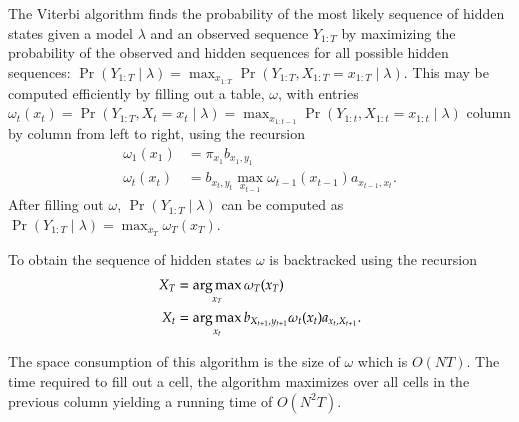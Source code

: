 The Viterbi algorithm finds the probability of the most likely sequence of
hidden states given a model $\lambda$ and an observed sequence $Y_{1:T}$ by
maximizing the probability of the observed and hidden sequences for all
possible hidden sequences: $\Pr(Y_{1:T} \mid \lambda) = \max_{x_{1:T}}
\Pr(Y_{1:T}, X_{1:T} = x_{1:T} \mid \lambda)$. This may be computed efficiently
by filling out a table, $\omega$, with entries $\omega_t(x_t) = \Pr(Y_{1:T},
X_t = x_t \mid \lambda) = \max_{x_{1:t-1}} \Pr(Y_{1:t}, X_{1:t} = x_{1:t} \mid
\lambda)$ column by column from left to right, using the recursion
\begin{align*}
  \omega_1(x_1) &= \pi_{x_1} b_{x_1, y_1} \\
  \omega_t(x_t) &= b_{x_t, y_t} \max_{x_{t - 1}} \omega_{t - 1}(x_{t - 1})
                  a_{x_{t - 1}, x_t}.
\end{align*}
After filling out $\omega$, $\Pr(Y_{1:T} \mid \lambda)$ can be computed as
$\Pr(Y_{1:T} \mid \lambda) = \max_{x_T} \omega_T(x_T)$.

To obtain the sequence of hidden states $\omega$ is backtracked using the
recursion
\begin{align*}
  X_T &= \operatorname*{arg\,max}_{x_T} \omega_T(x_T) \\
  X_{t} &= \operatorname*{arg\,max}_{x_{t}} b_{X_{t + 1}, y_{t + 1}} \omega_{t}(x_t) a_{x_t, X_{t + 1}}.
\end{align*}

The space consumption of this algorithm is the size of $\omega$ which is $O(N
T)$. The time required to fill out a cell, the algorithm maximizes over all
cells in the previous column yielding a running time of $O(N^2 T)$.

